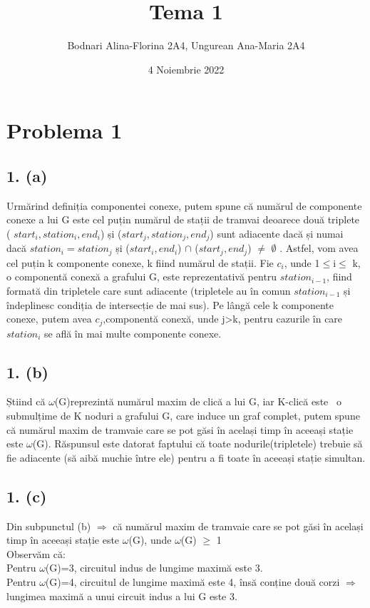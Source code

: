 \documentclass[12pt] {fphw}
\title{Tema 1}
\author{Bodnari Alina-Florina 2A4, Ungurean Ana-Maria 2A4 } %
\date{4 Noiembrie 2022} %
\institute{Universitatea Alexandru Ioan-Cuza \\ Facultatea de Informatică} %
\begin{document}
\maketitle 

\section*{Problema 1}
\subsection*{1. (a)} 
 
Urmărind definiția componentei conexe, putem spune că numărul de componente conexe a lui G este cel puțin numărul de stații de tramvai deoarece două triplete ( ${}start_i, station_i, end_i$) și (${}start_j, station_j, end_j$) sunt adiacente dacă și numai dacă ${}station_i=station_j$ și (${}start_i, end_i$) $\cap$  (${}start_j, end_j$) $\neq$  $\emptyset$ . Astfel, vom avea cel puțin k componente conexe, k fiind numărul de stații.  Fie ${}c_i$, unde 1$\leq$i$\leq$ k, o componentă conexă a grafului G, este reprezentativă pentru ${}station_{i-1}$,
fiind formată din tripletele care sunt adiacente (tripletele au în comun  ${}station_{i-1}$ 
și îndeplinesc condiția de intersecție de mai sus). Pe lângă cele k componente conexe, putem avea ${}c_j$,componentă conexă, unde j>k,  pentru cazurile în care  ${}station_i$ se află în  mai multe componente conexe.  

\subsection*{1. (b)}

Știind că $\omega$(G)reprezintă numărul maxim de clică a lui G, iar K-clică este \ o submulțime de K noduri a grafului G, care induce un graf complet, putem spune că numărul maxim de tramvaie care se pot găsi în același timp în aceeași stație este  $\omega$(G). Răspunsul este datorat faptului că toate nodurile(tripletele) trebuie să fie adiacente (să aibă muchie între ele) pentru a fi toate în aceeași stație simultan.  

\subsection*{1. (c)}
Din subpunctul (b) $\Longrightarrow$ că numărul maxim de tramvaie care se pot găsi în același timp în aceeași stație este $\omega$(G), unde $\omega$(G) $\geq$ 1 \\ Observăm că: \\ Pentru  
$\omega$(G)=3, circuitul indus de lungime maximă este 3. \\ Pentru $\omega$(G)=4, circuitul de lungime maximă este 4, însă conține două corzi $\Longrightarrow$ lungimea maximă a unui circuit indus a lui G este 3. 
 
\end{document}

